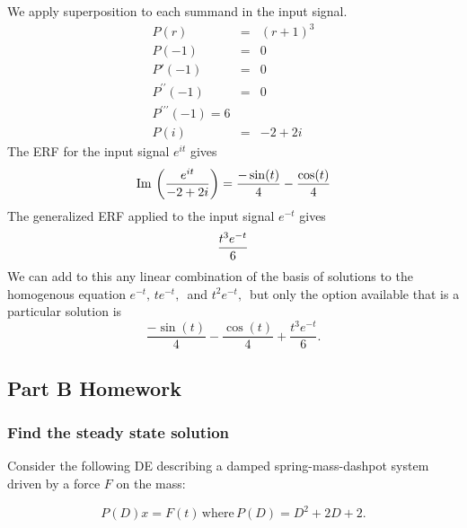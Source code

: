  We apply superposition to each summand in the input signal.
 \begin{eqnarray*}
   P(r) &=& (r+1)^3 \\
   P(-1) &=& 0 \\
   P'(-1) &=& 0 \\
   P^{\prime \prime}(-1) &=&  0 \\
   P^{\prime \prime \prime}(-1) = 6 \\
   P(i) &=& -2 + 2i
 \end{eqnarray*}
 The ERF for the input signal $e^{it}$ gives
 \begin{equation*}
   \displaystyle  \displaystyle \mathrm{Im\, }\left(\frac{e^{it}}{-2+2i}\right)
   \displaystyle =
   \displaystyle  \frac{-\sin (t)}{4}-\frac{\cos (t)}{4}
 \end{equation*}
 The generalized ERF applied to the input signal $e^{−t}$ gives
 \begin{equation*}
   \displaystyle  \displaystyle \frac{t^3e^{-t}}{6}
 \end{equation*}
 We can add to this any linear combination of the basis of solutions to the homogenous equation $e^{−t},\, te^{-t},\,$ and $t^2e^{-t},\,$
 but only the option available that is a particular solution is
 \begin{equation*}
   \frac{-\sin (t)}{4}-\frac{\cos (t)}{4}+\frac{t^3e^{-t}}{6}.
 \end{equation*}

\clearpage

\subsection{Part B Homework}

\subsubsection{Find the steady state solution}

Consider the following DE describing a damped spring-mass-dashpot system driven
by a force $F$ on the mass:

\begin{equation*}
  P(D)x=F(t)\, \text {where}\,  P(D)=D^2+2D+2.
\end{equation*}

